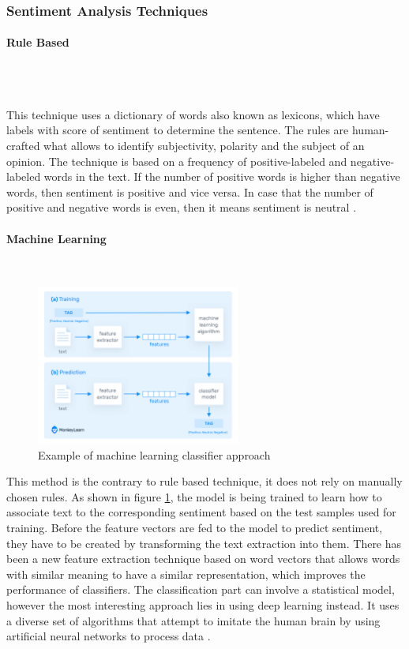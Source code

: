 \documentclass{article}
\newcommand{\subsubsubsection}[1]{\paragraph{#1}\mbox{}\\}
\begin{document}
\subsubsection{Sentiment Analysis Techniques}
\subsubsubsection{Rule Based}
{\large
\\ This technique uses a dictionary of words also known as lexicons, which have labels with score of sentiment to determine the sentence. The rules are human-crafted what allows to identify subjectivity, polarity and the subject of an opinion. The technique is based on a frequency of positive-labeled and negative-labeled words in the text. If the number of positive words is higher than negative words, then sentiment is positive and vice versa. In case that the number of positive and negative words is even, then it means sentiment is neutral \parencite{monkey}.\par
}

\subsubsubsection{Machine Learning}
\label{sec:ml}
\begin{figure}
  \vspace{-20pt}
  \begin{center}
    \includegraphics[width=0.6\textwidth]{img/monkey.png}
  \end{center}
  \vspace{-20pt}
  \caption{Example of machine learning classifier approach}
  \label{fig:monkey}
  \vspace{-20pt}
\end{figure}
{\large
This method is the contrary to rule based technique, it does not rely on manually chosen rules. As shown in figure \ref{fig:monkey}, the model is being trained to learn how to associate text to the corresponding sentiment based on the test samples used for training. Before the feature vectors are fed to the model to predict sentiment, they have to be created by transforming the text extraction into them. There has been a new feature extraction technique based on word vectors that allows words with similar meaning to have a similar representation, which improves the performance of classifiers. The classification part can involve a statistical model, however the most interesting approach lies in using deep learning instead. It uses a diverse set of algorithms that attempt to imitate the human brain by using artificial neural networks to process data \parencite{monkey}.\par
}
\end{document}
